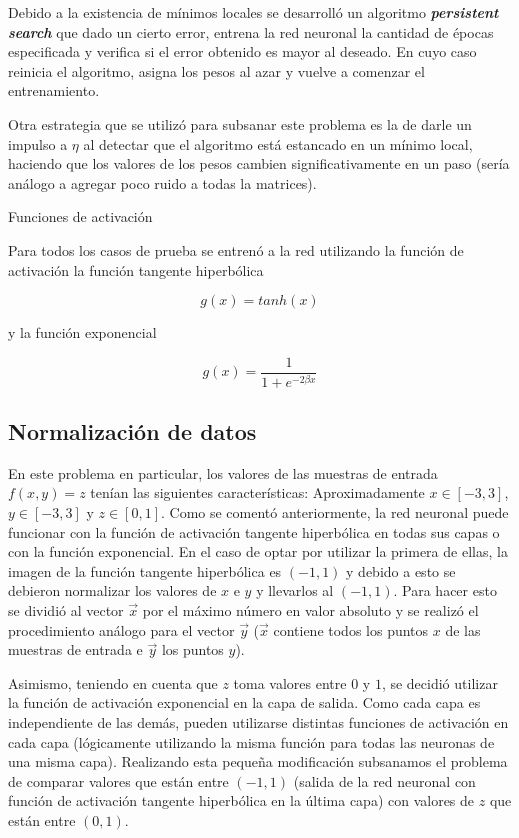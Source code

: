 \documentclass[%
    final,
    reprint,
    notitlepage,
    narroweqnarray,
    inline,
    twoside,
    invited
    ]{ieee}
\begin{document}
\par Debido a la existencia de mínimos locales se desarrolló un algoritmo  \textbf{\textit{persistent search}} que dado un cierto error, entrena
 la red neuronal la cantidad de épocas especificada y verifica si el error obtenido es mayor al deseado. En cuyo caso reinicia el algoritmo, asigna 
los pesos al azar y vuelve a comenzar el entrenamiento.\\
\par Otra estrategia que se utilizó para subsanar este problema es la de darle un impulso a $\eta$ al detectar que el algoritmo está estancado 
en un mínimo local, haciendo que los valores de los pesos cambien significativamente en un paso (sería análogo a agregar poco ruido a todas la matrices).

\par{Funciones de activación}

\par Para todos los casos de prueba se entrenó a la red utilizando la función de activación la función tangente hiperbólica

\begin{equation}
g(x) = tanh(x)
\end{equation}


y la función exponencial

\begin{equation}
g(x) = \frac{1}{1+e^{-2 \beta x}}
\end{equation}

\subsection{Normalización de datos}

\par En este problema en particular, los valores de las muestras de entrada $f(x,y) = z$ tenían las siguientes características: Aproximadamente $x\in [-3,3]$, $y\in [-3,3]$ y $z\in [0,1]$. 
Como se comentó anteriormente, la red neuronal puede funcionar con la función de activación tangente hiperbólica en todas sus capas o con la función exponencial. En el caso de optar por utilizar la primera de ellas, la imagen de la función tangente hiperbólica es $(-1,1)$ y debido a esto se debieron normalizar los valores de $x$ e $y$ y llevarlos al $(-1,1)$. Para hacer esto se dividió al vector  $\vec{x}$ por el máximo número en valor absoluto y se realizó el procedimiento análogo para el vector $\vec{y}$ ($\vec{x}$ contiene todos los puntos $x$ de las muestras de entrada e $\vec{y}$ los puntos $y$).\\
\par Asimismo, teniendo en cuenta que $z$ toma valores entre $0$ y $1$, se decidió utilizar la función de activación exponencial en la capa de salida. Como cada capa es independiente de las demás, pueden utilizarse distintas funciones de activación en cada capa (lógicamente utilizando la misma función para todas las neuronas de una misma capa). Realizando esta pequeña modificación subsanamos el problema de comparar valores que están entre $(-1,1)$ (salida de la red neuronal con función de activación tangente hiperbólica en la última capa) con valores de $z$ que están entre $(0,1)$.
\end{document}
